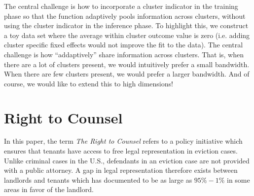 \documentclass[a4paper,12pt]{article}
\begin{document}
The central challenge is how to incorporate a cluster indicator in the training phase so that the function adaptively pools information across clusters, without using the cluster indicator in the inference phase. To highlight this, we construct a toy data set where the average within cluster outcome value is zero (i.e. adding cluster specific fixed effects would not improve the fit to the data). The central challenge is how ``addaptively'' share information across clusters. That is, when there are a lot of clusters present, we would intuitively prefer a small bandwidth. When there are few clusters present, we would prefer a larger bandwidth. And of course, we would like to extend this to high dimensions!

\section{Right to Counsel}
In this paper, the term \textit{The Right to Counsel} refers to a policy initiative which ensures that tenants have access to free legal representation in eviction cases. Unlike criminal cases in the U.S., defendants in an eviction case are not provided with a public attorney. A gap in legal representation therefore exists between landlords and tenants which \cite{collinson2022eviction} has documented to be as large as $95\%-1\%$ in some areas in favor of the landlord.
\end{document}
